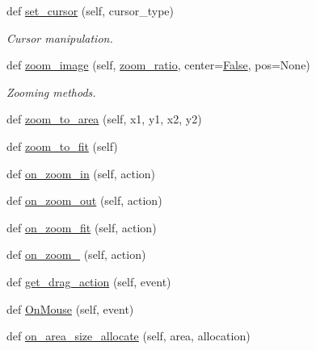 \begin{DoxyCompactItemize}
\item 
def \hyperlink{classsmacc__viewer_1_1xdot_1_1wxxdot_1_1WxDotWindow_ae434fe0d8d0396a92488c6e8477b3674}{set\+\_\+cursor} (self, cursor\+\_\+type)
\begin{DoxyCompactList}\small\item\em Cursor manipulation. \end{DoxyCompactList}\item 
def \hyperlink{classsmacc__viewer_1_1xdot_1_1wxxdot_1_1WxDotWindow_a2bf85fb763c88fed05071ebb1fad5b57}{zoom\+\_\+image} (self, \hyperlink{classsmacc__viewer_1_1xdot_1_1wxxdot_1_1WxDotWindow_ab53373bad50bdff06f2b31afa577fca2}{zoom\+\_\+ratio}, center=\hyperlink{namespacesmacc__viewer_a5928e8da279785cbab9011356c3eaa87}{False}, pos=None)
\begin{DoxyCompactList}\small\item\em Zooming methods. \end{DoxyCompactList}\item 
def \hyperlink{classsmacc__viewer_1_1xdot_1_1wxxdot_1_1WxDotWindow_a25459adbe4811e397c9ceaef296c48de}{zoom\+\_\+to\+\_\+area} (self, x1, y1, x2, y2)
\item 
def \hyperlink{classsmacc__viewer_1_1xdot_1_1wxxdot_1_1WxDotWindow_a06fdd60784dd744806e321a4d3959569}{zoom\+\_\+to\+\_\+fit} (self)
\item 
def \hyperlink{classsmacc__viewer_1_1xdot_1_1wxxdot_1_1WxDotWindow_aca1d6557157ddc96b9148fe4d6833b44}{on\+\_\+zoom\+\_\+in} (self, action)
\item 
def \hyperlink{classsmacc__viewer_1_1xdot_1_1wxxdot_1_1WxDotWindow_a8ca10df85b23dc744c8cdbef04f9a2f3}{on\+\_\+zoom\+\_\+out} (self, action)
\item 
def \hyperlink{classsmacc__viewer_1_1xdot_1_1wxxdot_1_1WxDotWindow_ab0cf680254a86f053417b91fbbccf3fd}{on\+\_\+zoom\+\_\+fit} (self, action)
\item 
def \hyperlink{classsmacc__viewer_1_1xdot_1_1wxxdot_1_1WxDotWindow_a56e3e9be0186296c2a0c92e515341844}{on\+\_\+zoom\+\_} (self, action)
\item 
def \hyperlink{classsmacc__viewer_1_1xdot_1_1wxxdot_1_1WxDotWindow_a19928d54bec027dc5a6257d5d0d954d6}{get\+\_\+drag\+\_\+action} (self, event)
\item 
def \hyperlink{classsmacc__viewer_1_1xdot_1_1wxxdot_1_1WxDotWindow_acdc63eb484c7223eac5d3a752dbf8ee2}{On\+Mouse} (self, event)
\item 
def \hyperlink{classsmacc__viewer_1_1xdot_1_1wxxdot_1_1WxDotWindow_a207901e52671de3d6af5d66a8840205c}{on\+\_\+area\+\_\+size\+\_\+allocate} (self, area, allocation)

\end{DoxyCompactItemize}
